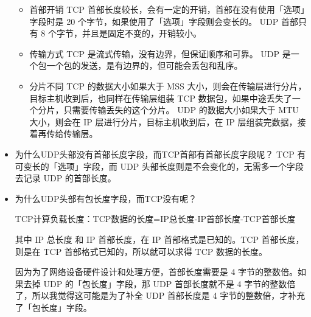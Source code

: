 \documentclass[11pt]{article}
\begin{document}
\begin{itemize}
\begin{itemize}
\item 首部开销
TCP 首部长度较长，会有一定的开销，首部在没有使用「选项」字段时是 20 个字节，如果使用了「选项」字段则会变长的。
UDP 首部只有 8 个字节，并且是固定不变的，开销较小。

\item 传输方式
TCP 是流式传输，没有边界，但保证顺序和可靠。
UDP 是一个包一个包的发送，是有边界的，但可能会丢包和乱序。

\item 分片不同
TCP 的数据大小如果大于 MSS 大小，则会在传输层进行分片，目标主机收到后，也同样在传输层组装 TCP 数据包，如果中途丢失了一个分片，只需要传输丢失的这个分片。
UDP 的数据大小如果大于 MTU 大小，则会在 IP 层进行分片，目标主机收到后，在 IP 层组装完数据，接着再传给传输层。
\end{itemize}

\item 为什么UDP头部没有首部长度字段，而TCP首部有首部长度字段呢？
TCP 有可变长的「选项」字段，而 UDP 头部长度则是不会变化的，无需多一个字段去记录 UDP 的首部长度。
\item 为什么UDP头部有包长度字段，而TCP没有呢？

TCP计算负载长度：TCP数据的长度=IP总长度-IP首部长度-TCP首部长度

其中 IP 总长度 和 IP 首部长度，在 IP 首部格式是已知的。TCP 首部长度，则是在 TCP 首部格式已知的，所以就可以求得 TCP 数据的长度。

因为为了网络设备硬件设计和处理方便，首部长度需要是 4 字节的整数倍。如果去掉 UDP 的「包长度」字段，那 UDP 首部长度就不是 4 字节的整数倍了，所以我觉得这可能是为了补全 UDP 首部长度是 4 字节的整数倍，才补充了「包长度」字段。
\end{itemize}
\end{document}
